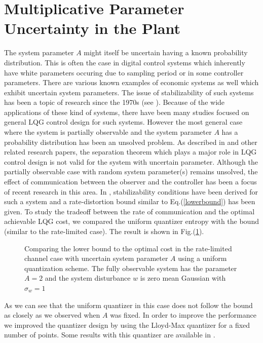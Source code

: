 \documentclass[12pt]{caltech_thesis_finalreport}
\begin{document}
\section{Multiplicative Parameter Uncertainty in the Plant}
	The system parameter $A$ might itself be uncertain having a known probability distribution. This is often the case in digital control systems which inherently have white parameters occuring due to sampling period or in some controller parameters. There are various known examples of economic systems as well which exhibit uncertain system parameters. The issue of stabilizability of such systems has been a topic of research since the 1970s (see \cite{utp}). Because of the wide applications of these kind of systems, there have been many studies focused on general LQG control design for such systems. However the most general case where the system is partially observable and the system parameter $A$ has a probability distribution has been an unsolved problem. As described in \cite{berstekas} and other related research papers, the separation theorem which plays a major role in LQG control design is not valid for the system with uncertain parameter. Although the partially observable case with random system parameter(s) remains unsolved, the effect of communication between the observer and the controller has been a focus of recent research in this area. In \cite{victoria2}, stabilizability conditions have been derived for such a system and a rate-distortion bound similar to Eq.(\ref{lowerbound}) has been given. To study the tradeoff between the rate of communication and the optimal achievable LQG cost, we compared the uniform quantizer entropy with the bound (similar to the rate-limited case). The result is shown in Fig.(\ref{bound_randomA}). 
	\begin{figure}[H]
			  \centering
%			  
			  \tiny{
			}
			  \caption{Comparing the lower bound to the optimal cost in the rate-limited channel case with uncertain system parameter $A$ using a uniform quantization scheme. The fully observable system has the parameter $A = 2$ and the system disturbance $w$ is zero mean Gaussian with $\sigma_{w} = 1$}
			 \label{bound_randomA}
		\end{figure}	
		
	As we can see that the uniform quantizer in this case does not follow the bound as closely as we observed when $A$ was fixed. In order to improve the performance we improved the quantizer design by using the Lloyd-Max quantizer for a fixed number of points. Some results with this quantizer are available in \cite{git}.
\end{document}
